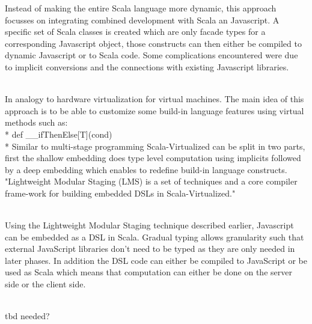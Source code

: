 Instead of making the entire Scala language more dynamic, this approach focusses on integrating combined development with Scala an Javascript. A specific set of Scala classes is created which are only facade types for a corresponding Javascript object, those constructs can then either be compiled to dynamic Javascript or to Scala code. Some complications encountered were due to implicit conversions and the connections with existing Javascript libraries.
\\
\\

In analogy to hardware virtualization for virtual machines. The main idea of this approach is to be able to customize some build-in language features using virtual methods such as:\\*
{\ttfamily def \_\_ifThenElse[T](cond) }\\*
Similar to multi-stage programming Scala-Virtualized can be split in two parts, first the shallow embedding does type level computation using implicits followed by a deep embedding which enables to redefine build-in language constructs. "Lightweight Modular Staging (LMS) is a set of techniques and a core compiler frame-work for building embedded DSLs in Scala-Virtualized."
\\
\\

Using the Lightweight Modular Staging technique described earlier, Javascript can be embedded as a DSL in Scala. Gradual typing allows granularity such that external JavaScript libraries don't need to be typed as they are only needed in later phases. In addition the DSL code can either be compiled to JavaScript or be used as Scala which means  that computation can either be done on the server side or the client side. 
\\
\\

tbd needed?
\\
\\

